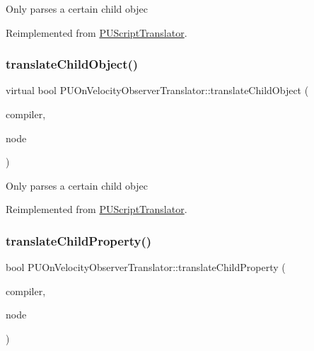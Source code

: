 Only parses a certain child objec 

Reimplemented from \hyperlink{classPUScriptTranslator_ab587d01348ae3e678cb700c719b2b113}{P\+U\+Script\+Translator}.

\mbox{\label{classPUOnVelocityObserverTranslator_a935b5d358c24effd602e203790aa3b2a}} 
\subsubsection{\texorpdfstring{translate\+Child\+Object()}{translateChildObject()}\hspace{0.1cm}{\footnotesize\ttfamily [2/2]}}
{\footnotesize\ttfamily virtual bool P\+U\+On\+Velocity\+Observer\+Translator\+::translate\+Child\+Object (\begin{DoxyParamCaption}\item[{\hyperlink{classPUScriptCompiler}{P\+U\+Script\+Compiler} $\ast$}]{compiler,  }\item[{\hyperlink{classPUAbstractNode}{P\+U\+Abstract\+Node} $\ast$}]{node }\end{DoxyParamCaption})\hspace{0.3cm}{\ttfamily [virtual]}}

Only parses a certain child objec 

Reimplemented from \hyperlink{classPUScriptTranslator_ab587d01348ae3e678cb700c719b2b113}{P\+U\+Script\+Translator}.

\mbox{\label{classPUOnVelocityObserverTranslator_aa44d7a735f155168fcd5f67cb450e159}} 
\subsubsection{\texorpdfstring{translate\+Child\+Property()}{translateChildProperty()}\hspace{0.1cm}{\footnotesize\ttfamily [1/2]}}
{\footnotesize\ttfamily bool P\+U\+On\+Velocity\+Observer\+Translator\+::translate\+Child\+Property (\begin{DoxyParamCaption}\item[{\hyperlink{classPUScriptCompiler}{P\+U\+Script\+Compiler} $\ast$}]{compiler,  }\item[{\hyperlink{classPUAbstractNode}{P\+U\+Abstract\+Node} $\ast$}]{node }\end{DoxyParamCaption})\hspace{0.3cm}{\ttfamily [virtual]}}

